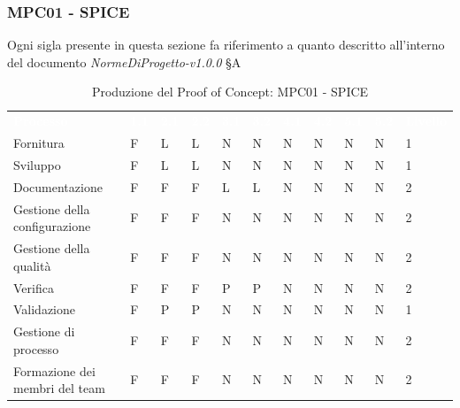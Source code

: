 \subsubsection{MPC01 - SPICE}
Ogni sigla presente in questa sezione fa riferimento a quanto descritto all'interno del documento \textit{NormeDiProgetto-v1.0.0} §A


\begin{table}[H]
        \renewcommand{\arraystretch}{1.5}
        \begin{tabular}{ m{}<{\centering}  m{}<{\centering} m{}<{\centering} m{}<{\centering} m{}<{\centering} m{}<{\centering} m{}<{\centering} m{}<{\centering} m{}<{\centering} m{}<{\centering} m{}<{\centering}}
	\rowcolor{darkblue}
	\textcolor{white}{\textbf{Processo}} &\textcolor{white}{\textbf{1.1}} &\textcolor{white}{\textbf{2.1}} &\textcolor{white}{\textbf{2.2}} &\textcolor{white}{\textbf{3.1}} &\textcolor{white}{\textbf{3.2}} &\textcolor{white}{\textbf{4.1}} &\textcolor{white}{\textbf{4.2}} &\textcolor{white}{\textbf{5.1}} &\textcolor{white}{\textbf{5.2}} &\textcolor{white}{\textbf{Livello}}\\ 


	Fornitura & F & L & L & N & N & N & N & N & N & 1 \\
    Sviluppo & F & L & L & N & N & N & N & N & N & 1 \\
    Documentazione & F & F & F & L & L & N & N & N & N & 2 \\
    Gestione della configurazione & F & F & F & N & N & N & N & N & N & 2 \\
    Gestione della qualità & F & F & F & N & N & N & N & N & N & 2 \\
    Verifica & F & F & F & P & P & N & N & N & N & 2 \\
   Validazione & F & P & P & N & N & N & N & N & N & 1 \\
    Gestione di processo & F & F & F & N & N & N & N & N & N & 2 \\
    Formazione dei membri del team & F & F & F & N & N & N & N & N & N & 2 \\
    
\end{tabular}       
\caption{Produzione del Proof of Concept: MPC01 - SPICE}
\end{table}

